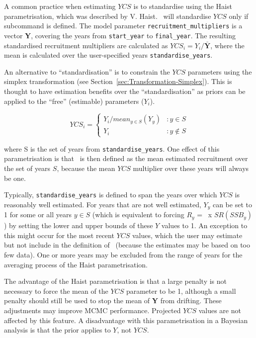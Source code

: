 A common practice when estimating $YCS$ is to standardise using the Haist parametrisation, which was described by V. Haist. \CNAME\ will standardise $YCS$ only if subcommand  is defined. The model parameter \texttt{recruitment\_multipliers} is a vector \textbf{Y}, covering the years from \texttt{start\_year} to \texttt{final\_year}. The resulting standardised recruitment multipliers are calculated as $YCS_i=Y_i/\bar{\textbf{Y}}$, where the mean is calculated over the user-specified years \texttt{standardise\_years}.

An alternative to \enquote{standardisation} is to constrain the $YCS$ parameters using the simplex transformation (see Section~\ref{sec:Transformation-Simplex}). This is thought to have estimation benefits over the \enquote{standardisation} as priors can be applied to the \enquote{free} (estimable) parameters (\(Y_i\)).

\[
YCS_i =
\begin{cases}
Y_i / mean_{y \in S}(Y_y) & :y \in S\\
Y_i					 & :y \notin S
\end{cases}
\]

where S is the set of years from \texttt{standardise\_years}. One effect of this parametrisation is that \Rzero\ is then defined as the mean estimated recruitment over the set of years $S$, because the mean $YCS$ multiplier over these years will always be one.

Typically, \texttt{standardise\_years} is defined to span the years over which $YCS$ is reasonably well estimated. For years that are not well estimated, $Y_y$ can be set to 1 for some or all years $y\in S$ (which is equivalent to forcing $R_y$ = \Rzero\ x $SR(SSB_y)$) by setting the lower and upper bounds of these $Y$ values to 1. An exception to this might occur for the most recent $YCS$ values, which the user may estimate but not include in the definition of \Rzero\ (because the estimates may be based on too few data). One or more years may be excluded from the range of years for the averaging process of the Haist parametrisation.

The advantage of the Haist parametrisation is that a large penalty is not necessary to force the mean of the $YCS$ parameter to be 1, although a small penalty should still be used to stop the mean of \textbf{Y} from drifting. These adjustments may improve MCMC performance. Projected $YCS$ values are not affected by this feature. A disadvantage with this parametrisation in a Bayesian analysis is that the prior applies to $Y$, not $YCS$.

